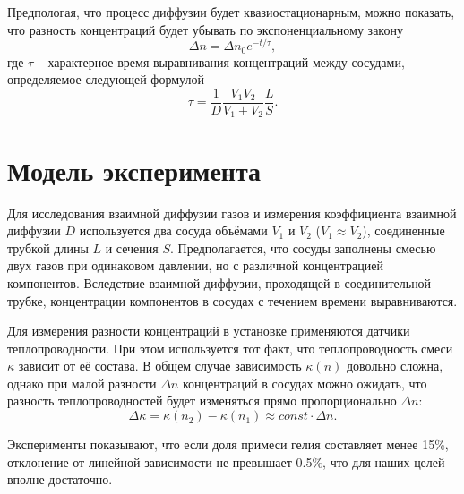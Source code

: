 \documentclass[a4paper, 12pt]{article}
\begin{document}
        Предпологая, что процесс диффузии будет квазиостационарным, можно показать, что разность концентраций будет убывать по экспоненциальному закону
        \begin{equation}
            \label{Delta_n}
            \Delta n = \Delta n_0 e^{-t / \tau},
        \end{equation}
        где $\tau$ -- характерное время выравнивания концентраций между сосудами, определяемое следующей формулой
        \begin{equation}
            \label{Tau}
            \tau = \frac{1}{D} \frac{V_1V_2}{V_1 + V_2} \frac{L}{S}.
        \end{equation}

    \section{Модель эксперимента}
        Для   исследования   взаимной диффузии газов и измерения коэффициента взаимной диффузии  $D$  используется  два сосуда  объёмами  $V_1$ и $V_2$ ($V_1 \approx V_2$), соединенные трубкой длины $L$ и сечения  $S$. Предполагается, что сосуды заполнены смесью двух газов при одинаковом давлении, но с различной концентрацией компонентов. Вследствие взаимной диффузии, проходящей в   соединительной трубке, концентрации компонентов в сосудах с течением времени выравниваются.

        Для измерения разности  концентраций  в установке применяются датчики теплопроводности. При этом используется тот факт, что теплопроводность смеси $\kappa$ зависит от её состава. В общем случае   зависимость  $\kappa (n)$  довольно   сложна,   однако   при   малой   разности  $\Delta n$ концентраций в сосудах можно ожидать, что разность теплопроводностей будет изменяться прямо пропорционально $\Delta n:$
        \begin{equation*}
            \Delta \kappa = \kappa (n_2) - \kappa (n_1) \approx const \cdot \Delta n.
        \end{equation*}

        Эксперименты показывают, что если доля примеси гелия составляет менее 15\%, отклонение от линейной зависимости не превышает 0.5\%, что для наших целей вполне достаточно.
\end{document}
